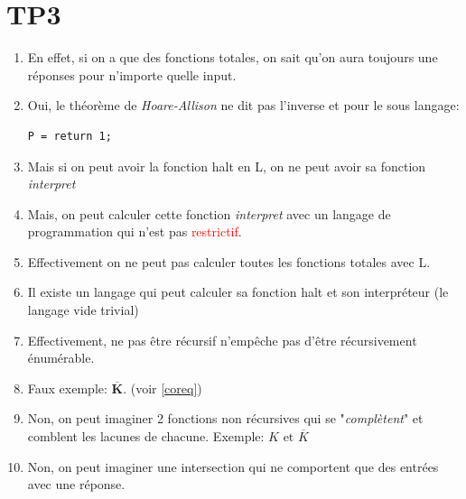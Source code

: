 \documentclass{report}
\begin{document}
\section{TP3}
\begin{enumerate}
\item En effet, si on a que des fonctions totales, on sait qu'on aura toujours une réponses pour n'importe quelle input.
\item Oui, le théorème de \textit{Hoare-Allison} ne dit pas l'inverse et pour le sous langage:
\begin{lstlisting}
P = return 1;
\end{lstlisting}
\item Mais si on peut avoir la fonction halt en L, on ne peut avoir sa fonction \textit{interpret}
\item Mais, on peut calculer cette fonction \textit{interpret} avec un langage de programmation qui n'est pas \textcolor{red}{restrictif}.
\item Effectivement on ne peut pas calculer toutes les fonctions totales avec L.
\item Il existe un langage qui peut calculer sa fonction halt et son interpréteur (le langage vide trivial)
\item Effectivement, ne pas être récursif n'empêche pas d'être récursivement énumérable.
\item Faux exemple: $\overline{\textbf{K}}$. (voir \ref{coreq})
\item Non, on peut imaginer 2 fonctions non récursives qui se "\textit{complètent}" et comblent les lacunes de chacune. Exemple: $K \text{ et } \overline{K}$
\item Non, on peut imaginer une intersection qui ne comportent que des entrées avec une réponse.
\end{enumerate}
\end{document}
